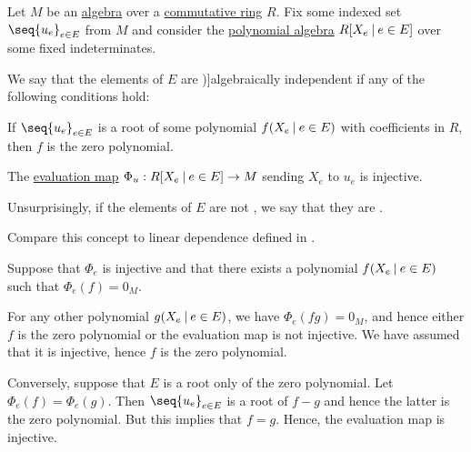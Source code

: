 \begin{definition}\label{def:algebraic_dependence}\mimprovised
  Let \( M \) be an \hyperref[def:algebra_over_ring]{algebra} over a \hyperref[def:ring/commutative]{commutative ring} \( R \). Fix some indexed set \( \seq{ u_e }_{e \in E} \) from \( M \) and consider the \hyperref[def:polynomial_algebra]{polynomial algebra} \( R[X_e \given e \in E] \) over some fixed indeterminates.

  We say that the elements of \( E \) are \term[ru=алгебрически независимые (елементы) (\cite[408]{Винберг2014КурсАлгебры})]{algebraically independent} if any of the following conditions hold:

  \begin{thmenum}
     If \( \seq{ u_e }_{e \in E} \) is a root of some polynomial \( f(X_e \given e \in E) \) with coefficients in \( R \), then \( f \) is the zero polynomial.

     The \hyperref[thm:polynomial_algebra_universal_property]{evaluation map} \( \Phi_u: R[X_e \given e \in E] \to M \) sending \( X_e \) to \( u_e \) is injective.
  \end{thmenum}
\end{definition}
\begin{comments}
  \item Unsurprisingly, if the elements of \( E \) are not , we say that they are .
  \item Compare this concept to linear dependence defined in .
\end{comments}
\begin{defproof}
   Suppose that \( \Phi_e \) is injective and that there exists a polynomial \( f(X_e \given e \in E) \) such that \( \Phi_e(f) = 0_M \).

  For any other polynomial \( g(X_e \given e \in E) \), we have \( \Phi_e(f g) = 0_M \), and hence either \( f \) is the zero polynomial or the evaluation map is not injective. We have assumed that it is injective, hence \( f \) is the zero polynomial.

   Conversely, suppose that \( E \) is a root only of the zero polynomial. Let \( \Phi_e(f) = \Phi_e(g) \). Then \( \seq{ u_e }_{e \in E} \) is a root of \( f - g \) and hence the latter is the zero polynomial. But this implies that \( f = g \). Hence, the evaluation map is injective.
\end{defproof}

